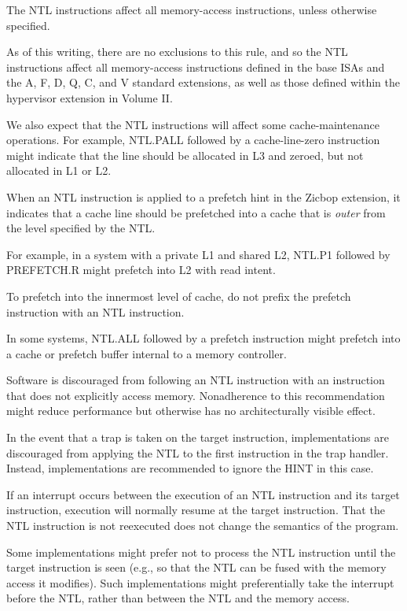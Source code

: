 The NTL instructions affect all memory-access instructions, unless otherwise
specified.

\begin{commentary}
As of this writing, there are no exclusions to this rule, and so
the NTL instructions affect all memory-access instructions
defined in the base ISAs and the A, F, D, Q, C, and V standard extensions,
as well as those defined within the hypervisor extension in Volume II.

We also expect that the NTL instructions will affect some cache-maintenance
operations.
For example, NTL.PALL followed by a cache-line-zero instruction might indicate
that the line should be allocated in L3 and zeroed, but not allocated in
L1 or L2.
\end{commentary}

When an NTL instruction is applied to a prefetch hint in the Zicbop extension,
it indicates that a cache line should be prefetched into a cache that is
{\em outer} from the level specified by the NTL.

\begin{commentary}
For example, in a system with a private L1 and shared L2, NTL.P1 followed by
PREFETCH.R might prefetch into L2 with read intent.

To prefetch into the innermost level of cache, do not prefix the prefetch
instruction with an NTL instruction.

In some systems, NTL.ALL followed by a prefetch instruction might prefetch
into a cache or prefetch buffer internal to a memory controller.
\end{commentary}

Software is discouraged from following an NTL instruction with an
instruction that does not explicitly access memory.
Nonadherence to this recommendation might reduce performance but
otherwise has no architecturally visible effect.

In the event that a trap is taken on the target instruction,
implementations are discouraged from applying the NTL to the first instruction
in the trap handler.
Instead, implementations are recommended to ignore the HINT in this case.

\begin{commentary}
If an interrupt occurs between the execution of an NTL instruction and its
target instruction, execution will normally resume at the
target instruction.
That the NTL instruction is not reexecuted does not change the semantics of
the program.

Some implementations might prefer not to process the NTL instruction until the
target instruction is seen (e.g., so that the NTL can be
fused with the memory access it modifies).
Such implementations might preferentially take the interrupt before the NTL,
rather than between the NTL and the memory access.
\end{commentary}

